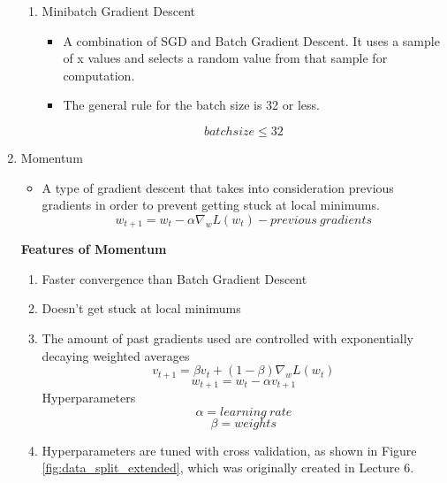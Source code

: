\begin{enumerate}
\begin{enumerate}
        \item Minibatch Gradient Descent
        \begin{itemize}
            \item A combination of SGD and Batch Gradient Descent. It uses a sample of x values and selects a random value from that sample for computation.
            \item The general rule for the batch size is 32 or less.
        \end{itemize} 
        \[
        batchsize \leq 32
        \]
    \end{enumerate}
    \item Momentum
    \begin{itemize}
        \item  A type of gradient descent that takes into consideration previous gradients in order to prevent getting stuck at local minimums.
        \[
        w_{t+1}=w_t-\alpha \nabla_w L(w_t)-previous\ gradients
        \]
    \end{itemize}
    \textbf{Features of Momentum}
    \begin{enumerate}
        \item Faster convergence than Batch Gradient Descent
        \item Doesn't get stuck at local minimums
        \item The amount of past gradients used are controlled with exponentially decaying weighted averages
        \[
        v_{t+1}=\beta v_t + (1-\beta)\nabla_wL(w_t)
        \]
        \[
        w_{t+1}=w_t-\alpha v_{t+1}
        \]
        Hyperparameters
        \[
        \alpha = learning\ rate
        \]
        \[
        \beta = weights
        \]
        \item Hyperparameters are tuned with cross validation, as shown in Figure \ref{fig:data_split_extended}, which was originally created in Lecture 6.
 \begin{figure}[ht]
    \centering
\end{figure}
\end{enumerate}
\end{enumerate}
